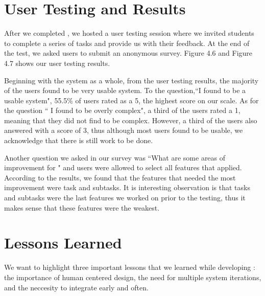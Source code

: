 \section{User Testing and Results}
After we completed \projectTitle, we hosted a user testing session where we invited students to complete a series of tasks and provide us with their feedback. At the end of the test, we asked users to submit an anonymous survey. Figure 4.6 and Figure 4.7 shows our user testing results. 
\par Beginning with the system as a whole, from the user testing results, the majority of the users found \projectTitle to be very usable system. To the question,``I found \projectTitle to be a usable system", 55.5\% of users rated \projectTitle as a 5, the highest score on our scale. As for the question `` I found \projectTitle to be overly complex", a third of the users rated \projectTitle a 1, meaning that they did not find \projectTitle to be complex. However, a third of the users also answered with a score of 3, thus although most users found \projectTitle to be usable, we acknowledge that there is still work to be done. 
\par Another question we asked in our survey was ``What are some areas of improvement for \projectTitle" and users were allowed to select all features that applied. According to the results, we found that the features that needed the most improvement were task and subtasks. It is interesting observation is that tasks and subtasks were the last features we worked on prior to the testing, thus it makes sense that these features were the weakest.  

\section{Lessons Learned}
We want to highlight three important lessons that we learned while developing \projectTitle: the importance of human centered design, the need for multiple system iterations, and the neccesity to integrate early and often.

